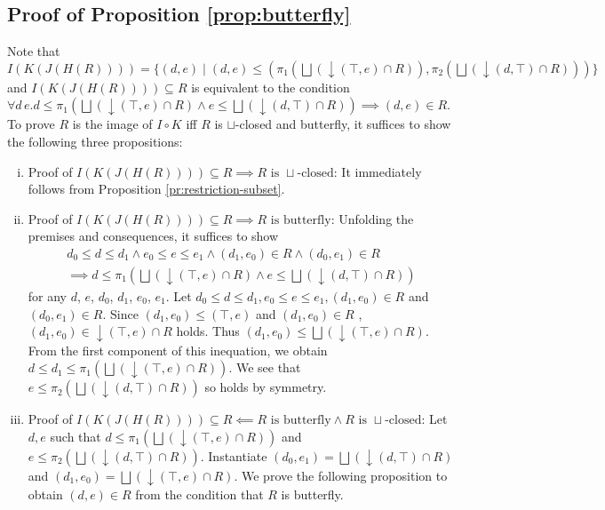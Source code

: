 \documentclass{llncs}
\newcommand{\join}{\sqcup}
\newcommand{\bigjoin}{\bigsqcup}
\newcommand{\comp}{\circ}
\begin{document}
\subsection{Proof of Proposition \ref{prop:butterfly}}
Note that $I(K(J(H(R)))) = \{ (d , e) \mid (d , e) \leq (\pi_{1} (\bigjoin(\downarrow (\top , e) \cap R)) , \pi_{2}(\bigjoin(\downarrow (d , \top) \cap R))) \}$ and
$I(K(J(H(R)))) \subseteq R$ is equivalent to the condition $\forall d\, e. d \leq \pi_{1} (\bigjoin(\downarrow (\top , e) \cap R) \land e \leq \bigjoin(\downarrow (d , \top) \cap R)) \implies (d , e) \in R$.
To prove $R$ is the image of $I \comp K$ iff $R$ is $\join$-closed and butterfly, it suffices to show the following three propositions:
\begin{enumerate}[i.]
  \item{Proof of $I(K(J(H(R)))) \subseteq R \implies R \text{ is } \join \text{-closed}$:}
    It immediately follows from Proposition \ref{pr:restriction-subset}.
  \item{Proof of $I(K(J(H(R)))) \subseteq R \implies R \text{ is butterfly}$:}
    Unfolding the premises and consequences, it suffices to show
    \begin{align*}
       d_{0} \leq d \leq d_{1} \land e_{0} \leq e \leq e_{1} \land (d_{1}, e_{0}) \in R \land (d_{0}, e_{1}) \in R \\
       \implies d \leq \pi_{1} (\bigjoin(\downarrow (\top , e) \cap R) \land e \leq \bigjoin(\downarrow (d , \top) \cap R))
    \end{align*}
    for any $d$, $e$, $d_{0}$, $d_{1}$, $e_{0}$, $e_{1}$.
    Let $d_{0} \leq d \leq d_{1}, e_{0} \leq e \leq e_{1}, (d_{1}, e_{0}) \in R$ and $(d_{0}, e_{1}) \in R$.
    Since $(d_{1} , e_{0}) \leq (\top , e)$ and $(d_{1} , e_{0}) \in R$ , $(d_{1} , e_{0}) \in \downarrow (\top , e) \cap R$ holds. Thus $(d_{1}, e_{0}) \leq \bigjoin(\downarrow (\top , e) \cap R)$. From the first component of this inequation, we obtain $d \leq d_{1} \leq \pi_{1} (\bigjoin(\downarrow (\top , e) \cap R))$. We see that $e \leq \pi_{2} (\bigjoin(\downarrow (d , \top) \cap R))$ so holds by symmetry.
  \item{Proof of $I(K(J(H(R)))) \subseteq R \impliedby R \text{ is butterfly} \land R \text{ is } \join \text{-closed}$:}
        Let $d, e$ such that $d \leq \pi_{1} (\bigjoin(\downarrow (\top , e) \cap R))$ and $e \leq \pi_{2} (\bigjoin(\downarrow (d , \top) \cap R))$.
        Instantiate $(d_{0}, e_{1}) = \bigjoin(\downarrow (d , \top) \cap R)$ and $(d_{1}, e_{0}) = \bigjoin(\downarrow (\top , e) \cap R)$. We prove the following proposition to obtain $(d , e) \in R$ from the condition that $R$ is butterfly.

\end{enumerate}
\end{document}
